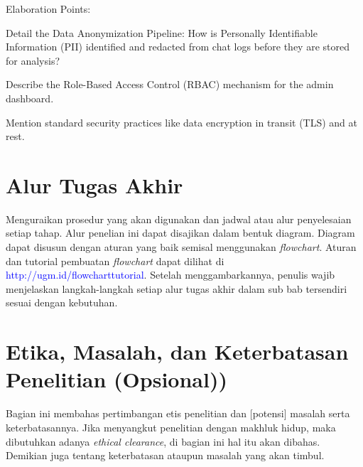 Elaboration Points:

Detail the Data Anonymization Pipeline: How is Personally Identifiable Information (PII) identified and redacted from chat logs before they are stored for analysis?

Describe the Role-Based Access Control (RBAC) mechanism for the admin dashboard.

Mention standard security practices like data encryption in transit (TLS) and at rest.

\section{Alur Tugas Akhir}

Menguraikan prosedur yang akan digunakan dan jadwal atau alur penyelesaian setiap 
tahap. Alur penelian ini dapat disajikan dalam bentuk diagram. Diagram dapat disusun dengan aturan yang baik semisal menggunakan \textit{flowchart}. Aturan dan tutorial pembuatan \textit{flowchart} dapat dilihat di \textcolor{blue}{http://ugm.id/flowcharttutorial}. Setelah menggambarkannya, penulis wajib menjelaskan langkah-langkah setiap alur tugas akhir dalam sub bab tersendiri sesuai dengan kebutuhan.

\section{Etika, Masalah, dan Keterbatasan Penelitian (Opsional))}

Bagian ini membahas pertimbangan etis penelitian dan [potensi] masalah serta
keterbatasannya. Jika menyangkut penelitian dengan makhluk hidup, maka dibutuhkan adanya \textit{ethical clearance}, di bagian ini hal itu akan dibahas. Demikian juga tentang keterbatasan ataupun masalah yang akan timbul.
